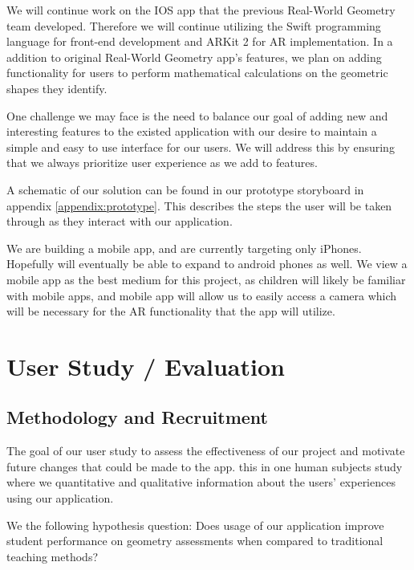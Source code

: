 \documentclass[acmsmall, nonacm]{acmart}
\begin{document}
{
  We will continue work on the IOS app that the previous Real-World Geometry team
  developed. Therefore we will continue utilizing the Swift programming language
  for front-end development and ARKit 2 for AR implementation. In a addition to
  original Real-World Geometry app's features, we plan on adding functionality for
  users to perform mathematical calculations on the geometric shapes they
  identify.

  One challenge we may face is the need to balance our goal of adding new and
  interesting features to the existed application with our desire to maintain a
  simple and easy to use interface for our users. We will address this by ensuring
  that we always prioritize user experience as we add to features.

  A schematic of our solution can be found in our prototype storyboard in appendix
  \ref{appendix:prototype}. This describes the steps the user will be taken
  through as they interact with our application.

  We are building a mobile app, and are currently targeting only
  iPhones. Hopefully will eventually be able to expand to android phones as
  well. We view a mobile app as the best medium for this project, as children will
  likely be familiar with mobile apps, and mobile app will allow us to easily
  access a camera which will be necessary for the AR functionality that the app
  will utilize.
}
\section{User Study / Evaluation}

\subsection{Methodology and Recruitment}

The goal of our user study  to assess the effectiveness
of our project and motivate future changes that could be made to the app.
 this in one human subjects study where we
 quantitative and qualitative information
about the users' experiences using our application.

We   the following hypothesis
question: Does usage of our application improve student performance on geometry
assessments when compared to traditional teaching methods?
\end{document}
